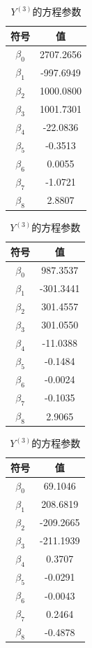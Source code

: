 \documentclass[UTF8, zihao=-4]{ctexart}
\begin{document}
		\begin{table}[H]
			\begin{minipage}[b]{0.3\textwidth}
				\centering
			\begin{tabular}{@{}c c@{}}
				\toprule
				\textbf{符号} & \textbf{值} \\
				\midrule
				$\beta_0$ & 2707.2656\\
				$\beta_1$ & -997.6949\\
				$\beta_2$ & 1000.0800\\
				$\beta_3$ & 1001.7301\\
				$\beta_4$ & -22.0836\\
				$\beta_5$ & -0.3513\\
				$\beta_6$ & 0.0055\\
				$\beta_7$ & -1.0721\\
				$\beta_8$ & 2.8807\\
				\bottomrule
			\end{tabular}
			\caption{$Y^{(1)}\text{的方程参数}$}
			\end{minipage}
			\begin{minipage}[b]{0.3\textwidth}
				\centering
			\begin{tabular}{@{}c c@{}}
				\toprule
				\textbf{符号} & \textbf{值} \\
				\midrule
				$\beta_0$ & 987.3537\\
				$\beta_1$ & -301.3441\\
				$\beta_2$ & 301.4557\\
				$\beta_3$ & 301.0550\\
				$\beta_4$ & -11.0388\\
				$\beta_5$ & -0.1484\\
				$\beta_6$ & -0.0024\\
				$\beta_7$ & -0.1035\\
				$\beta_8$ & 2.9065\\
				\bottomrule
			\end{tabular}
			\caption{$Y^{(2)}\text{的方程参数}$}
			\end{minipage}
			\begin{minipage}[b]{0.3\textwidth}
				\centering
			\begin{tabular}{@{}c c@{}}
				\toprule
				\textbf{符号} & \textbf{值} \\
				\midrule
				$\beta_0$ & 69.1046\\
				$\beta_1$ & 208.6819\\
				$\beta_2$ & -209.2665\\
				$\beta_3$ & -211.1939\\
				$\beta_4$ & 0.3707\\
				$\beta_5$ & -0.0291\\
				$\beta_6$ & -0.0043\\
				$\beta_7$ & 0.2464\\
				$\beta_8$ & -0.4878\\
				\bottomrule
			\end{tabular}
			\caption{$Y^{(3)}\text{的方程参数}$}
			\end{minipage}
			\end{table}
\end{document}
